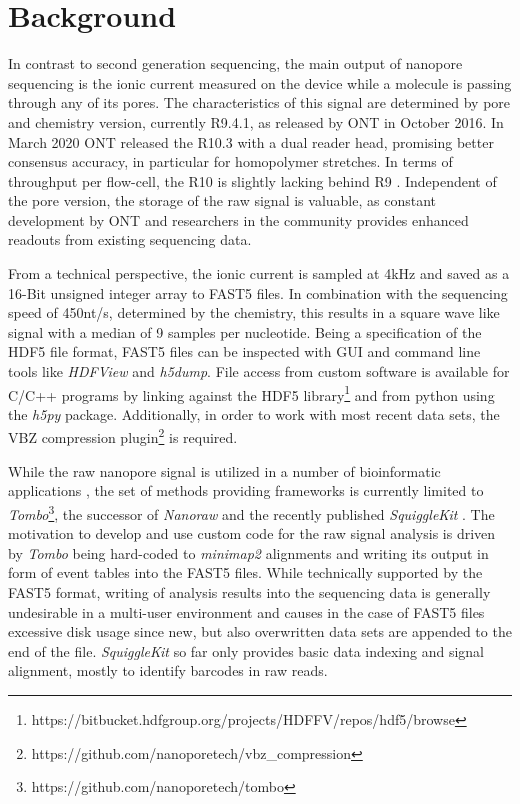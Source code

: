 \section{Background}
\label{sec:signal:background}

In contrast to second generation sequencing, the main output of nanopore sequencing is the ionic current measured on the device while a molecule is passing through any of its pores. The characteristics of this signal are determined by pore and chemistry version, currently R9.4.1, as released by ONT in October 2016. In March 2020 ONT released the R10.3 with a dual reader head, promising better consensus accuracy, in particular for homopolymer stretches. In terms of throughput per flow-cell, the R10 is slightly lacking behind R9 \cite{ONT2020}. Independent of the pore version, the storage of the raw signal is valuable, as constant development by ONT and researchers in the community provides enhanced readouts from existing sequencing data.

From a technical perspective, the ionic current is sampled at 4kHz and saved as a 16-Bit unsigned integer array to FAST5 files. In combination with the sequencing speed of \texttildelow450nt/s, determined by the chemistry, this results in a square wave like signal with a median of 9 samples per nucleotide. Being a specification of the HDF5 file format, FAST5 files can be inspected with GUI and command line tools like \textit{HDFView} and \textit{h5dump}. File access from custom software is available for C/C++ programs by linking against the HDF5 library\footnote{https://bitbucket.hdfgroup.org/projects/HDFFV/repos/hdf5/browse} and from python using the \textit{h5py} package. Additionally, in order to work with most recent data sets, the VBZ compression plugin\footnote{https://github.com/nanoporetech/vbz\_compression} is required.

While the raw nanopore signal is utilized in a number of bioinformatic applications \cite{Simpson2017, Wick2018, Loose2016}, the set of methods providing frameworks is currently limited to \textit{Tombo}\footnote{https://github.com/nanoporetech/tombo}, the successor of \textit{Nanoraw} \cite{Stoiber2017} and the recently published \textit{SquiggleKit} \cite{Ferguson2019}. The motivation to develop and use custom code for the raw signal analysis is driven by \textit{Tombo} being hard-coded to \textit{minimap2} alignments and writing its output in form of event tables into the FAST5 files. While technically supported by the FAST5 format, writing of analysis results into the sequencing data is generally undesirable in a multi-user environment and causes in the case of FAST5 files excessive disk usage since new, but also overwritten data sets are appended to the end of the file. \textit{SquiggleKit} so far only provides basic data indexing and signal alignment, mostly to identify barcodes in raw reads.

